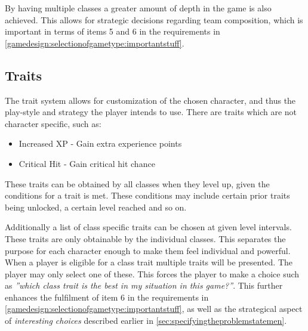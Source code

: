 By having multiple classes a greater amount of depth in the game is also achieved. This allows for strategic decisions regarding team composition, which is important in terms of items 5 and 6 in the requirements in \ref{gamedesign:selectionofgametype:importantstuff}.

\subsection*{Traits}\label{gamedesign:ourgame:traits}
The trait system allows for customization of the chosen character, and thus the play-style and strategy the player intends to use.
There are traits which are not character specific, such as:
\begin{itemize}
\item Increased XP - Gain extra experience points
\item Critical Hit  - Gain critical hit chance
\end{itemize} 
These traits can be obtained by all classes when they level up, given the conditions for a trait is met.
These conditions may include certain prior traits being unlocked, a certain level reached and so on.

Additionally a list of class specific traits can be chosen at given level intervals. 
These traits are only obtainable by the individual classes. 
This separates the purpose for each character enough to make them feel individual and powerful. 
When a player is eligible for a class trait multiple traits will be presented. 
The player may only select one of these. 
This forces the player to make a choice such as \emph{''which class trait is the best in my situation in this game?''}. 
This further enhances the fulfilment of item 6 in the requirements in \ref{gamedesign:selectionofgametype:importantstuff}, as well as the strategical aspect of \emph{interesting choices} described earlier in \ref{sec:specifyingtheproblemstatemen}.

